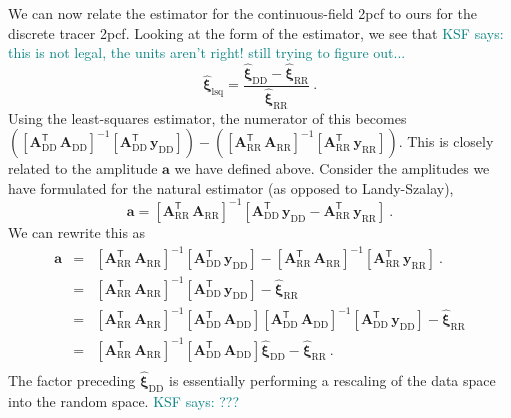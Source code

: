 \documentclass[modern]{aastex62}
\newcommand{\cf}{2pcf\xspace}
\newcommand{\inv}{^{-1}}
\newcommand{\T}{^{\mathsf{T}}}
\newcommand{\bld}[1]{\bm{#1}}
\newcommand{\KSF}[1]{\textcolor{teal}{KSF says: #1}}
\begin{document}
We can now relate the \cite{Tessore2018} estimator for the continuous-field \cf to ours for the discrete tracer \cf.
Looking at the form of the estimator, we see that \KSF{this is not legal, the units aren't right! still trying to figure out...}
\begin{equation}
\hat{\bld{\xi}}_\mathrm{lsq} = \frac{\hat{\bld{\xi}}_\mathrm{DD} - \hat{\bld{\xi}}_\mathrm{RR}}{\hat{\bld{\xi}}_\mathrm{RR}}  ~.       
\end{equation}
Using the least-squares estimator, the numerator of this becomes $ \left( [\bld{A}_{\mathrm{DD}}\T \, \bld{A}_{\mathrm{DD}}]\inv [\bld{A}_{\mathrm{DD}}\T\,\bld{y}_\mathrm{DD}] \right) - \left( [\bld{A}_{\mathrm{RR}}\T \, \bld{A}_{\mathrm{RR}}]\inv [\bld{A}_{\mathrm{RR}}\T\,\bld{y}_\mathrm{RR}] \right)$.
This is closely related to the amplitude $\bld{a}$ we have defined above. 
Consider the amplitudes we have formulated for the natural estimator (as opposed to Landy-Szalay), 
\begin{equation}
    \bld{a} = [\bld{A}_{\mathrm{RR}}\T \, \bld{A}_{\mathrm{RR}}]\inv [\bld{A}_{\mathrm{DD}}\T\,\bld{y}_\mathrm{DD} - \bld{A}_{\mathrm{RR}}\T\,\bld{y}_\mathrm{RR}] ~.
\end{equation}
We can rewrite this as 
\begin{eqnarray}
    \bld{a} &=& [\bld{A}_{\mathrm{RR}}\T \, \bld{A}_{\mathrm{RR}}]\inv [\bld{A}_{\mathrm{DD}}\T\,\bld{y}_\mathrm{DD}] - [\bld{A}_{\mathrm{RR}}\T \, \bld{A}_{\mathrm{RR}}]\inv [\bld{A}_{\mathrm{RR}}\T\,\bld{y}_\mathrm{RR}]  ~. \\
    &=& [\bld{A}_{\mathrm{RR}}\T \, \bld{A}_{\mathrm{RR}}]\inv [\bld{A}_{\mathrm{DD}}\T\,\bld{y}_\mathrm{DD}] - \hat{\bld{\xi}}_\mathrm{RR} \\
    &=& [\bld{A}_{\mathrm{RR}}\T \, \bld{A}_{\mathrm{RR}}]\inv [\bld{A}_{\mathrm{DD}}\T \, \bld{A}_{\mathrm{DD}}] [\bld{A}_{\mathrm{DD}}\T \, \bld{A}_{\mathrm{DD}}]\inv [\bld{A}_{\mathrm{DD}}\T\,\bld{y}_\mathrm{DD}] - \hat{\bld{\xi}}_\mathrm{RR} \\
    &=& [\bld{A}_{\mathrm{RR}}\T \, \bld{A}_{\mathrm{RR}}]\inv [\bld{A}_{\mathrm{DD}}\T \, \bld{A}_{\mathrm{DD}}] \hat{\bld{\xi}}_\mathrm{DD} - \hat{\bld{\xi}}_\mathrm{RR} ~.\\
\end{eqnarray}
The factor preceding $\hat{\bld{\xi}}_\mathrm{DD}$ is essentially performing a rescaling of the data space into the random space. \KSF{???}


\end{document}
